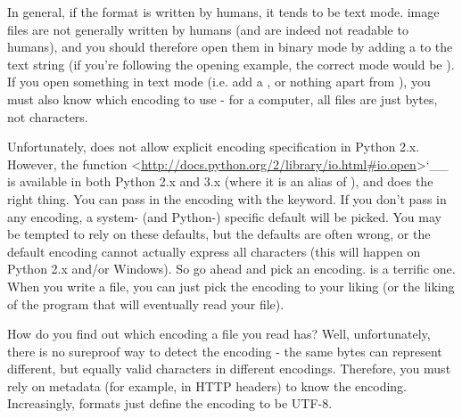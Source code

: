 \documentclass[a4paper,12pt,oneside]{sphinxmanual}
\begin{document}
In general, if the format is written by humans, it tends to be text
mode.  image files are not generally written by humans (and are
indeed not readable to humans), and you should therefore open them in
binary mode by adding a  to the text string (if you're following
the opening example, the correct mode would be ). If you open
something in text mode (i.e. add a , or nothing apart from
), you must also know which encoding to use - for a
computer, all files are just bytes, not characters.

Unfortunately,  does not allow explicit encoding specification
in Python 2.x. However, the function
 \textless{}\href{http://docs.python.org/2/library/io.html\#io.open}{http://docs.python.org/2/library/io.html\#io.open}\textgreater{}{}`\_\_ is
available in both Python 2.x and 3.x (where it is an alias of ),
and does the right thing. You can pass in the encoding with the
 keyword. If you don't pass in any encoding, a system- (and
Python-) specific default will be picked. You may be tempted to rely on
these defaults, but the defaults are often wrong, or the default
encoding cannot actually express all characters (this will happen on
Python 2.x and/or Windows). So go ahead and pick an encoding. 
is a terrific one. When you write a file, you can just pick the encoding
to your liking (or the liking of the program that will eventually read
your file).

How do you find out which encoding a file you read has? Well,
unfortunately, there is no sureproof way to detect the encoding - the
same bytes can represent different, but equally valid characters in
different encodings. Therefore, you must rely on metadata (for example,
in HTTP headers) to know the encoding. Increasingly, formats just define
the encoding to be UTF-8.
\end{document}
